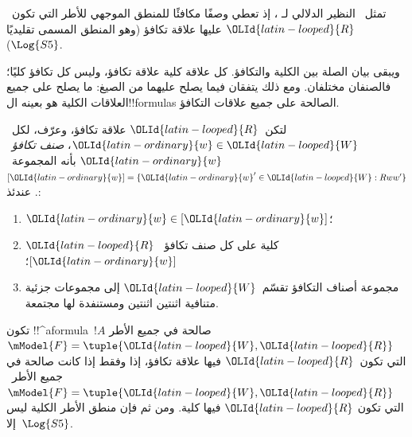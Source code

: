 \documentclass[../../../include/open-logic-section]{subfiles}
\begin{document}
تمثل~ النظير الدلالي لـ
، إذ تعطي وصفًا مكافئًا للمنطق الموجهي
للأطر التي تكون~${\OLId{latin-looped}{R}}$ عليها علاقة تكافؤ (وهو المنطق المسمى تقليديًا
$\Log{S5}$).

ويبقى بيان الصلة بين الكلية والتكافؤ. كل علاقة كلية علاقة تكافؤ،
وليس كل تكافؤ كليًا؛ فالصنفان مختلفان. ومع ذلك يتفقان فيما يصلح
عليهما من الصيغ: ما يصلح على جميع العلاقات الكلية هو بعينه
ال!!{formula}s الصالحة على جميع علاقات التكافؤ.

\begin{prop}
  لتكن~${\OLId{latin-looped}{R}}$ علاقة تكافؤ، وعرّف، لكل~${\OLId{latin-ordinary}{w}} \in {\OLId{latin-looped}{W}}$، \emph{صنف تكافؤ}~${\OLId{latin-ordinary}{w}}$
  بأنه المجموعة~$[{\OLId{latin-ordinary}{w}}] = \{{\OLId{latin-ordinary}{w}}'\in {\OLId{latin-looped}{W}} : Rww'\}$. عندئذ:
  \begin{enumerate}
  \item ${\OLId{latin-ordinary}{w}} \in [{\OLId{latin-ordinary}{w}}]$؛
  \item ${\OLId{latin-looped}{R}}$ كلية على كل صنف تكافؤ~$[{\OLId{latin-ordinary}{w}}]$؛
  \item مجموعة أصناف التكافؤ تقسّم~${\OLId{latin-looped}{W}}$ إلى مجموعات جزئية متنافية
    اثنتين اثنتين ومستنفدة لها مجتمعة.
  \end{enumerate}
\end{prop}

\begin{prop}
  تكون !!^a{formula}~$!A$ صالحة في جميع الأطر
  $\mModel{F} =\tuple{{\OLId{latin-looped}{W}},{\OLId{latin-looped}{R}}}$ التي تكون~${\OLId{latin-looped}{R}}$ فيها علاقة تكافؤ، إذا وفقط
  إذا كانت صالحة في جميع الأطر~$\mModel{F} =\tuple{{\OLId{latin-looped}{W}},{\OLId{latin-looped}{R}}}$ التي تكون
  ${\OLId{latin-looped}{R}}$ فيها كلية. ومن ثم فإن منطق الأطر الكلية ليس إلا~$\Log{S5}$.
\end{prop}
\end{document}
